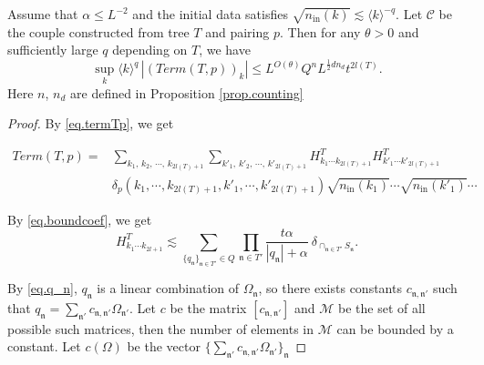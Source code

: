 \begin{lem}\label{lem.Tpvariance} Assume that $\alpha\le L^{-2}$ and the initial data satisfies $\sqrt{n_{\textrm{in}}(k)}\lesssim \langle k\rangle^{-q}$. Let $\mathcal{C}$ be the couple constructed from tree $T$ and pairing $p$. Then for any $\theta>0$ and sufficiently large $q$ depending on $T$, we have
\begin{equation}
    \sup_k\langle k\rangle^q\, |(Term(T,p))_k|\le L^{O(\theta)} Q^{n} L^{\frac{1}{2} dn_d} t^{2l(T)}.
\end{equation}
Here $n$, $n_d$ are defined in Proposition \ref{prop.counting}
\end{lem}
\begin{proof} By \eqref{eq.termTp}, we get

\begin{equation}
\begin{split}
    Term(T, p)=&\sum_{k_1,\, k_2,\, \cdots,\, k_{2l(T)+1}}\sum_{k'_1,\, k'_2,\, \cdots,\, k'_{2l(T)+1}} H^T_{k_1\cdots k_{2l(T)+1}} H^{T}_{k'_1\cdots k'_{2l(T)+1}}
    \\
    & \delta_{p}(k_1,\cdots, k_{2l(T)+1}, k'_1,\cdots, k'_{2l(T)+1})\sqrt{n_{\textrm{in}}(k_1)}\cdots\sqrt{n_{\textrm{in}}(k'_1)}\cdots
\end{split}
\end{equation}

By \eqref{eq.boundcoef}, we get
\begin{equation}
    H^T_{k_1\cdots k_{2l+1}}\lesssim \sum_{\{q_{\mathfrak{n}}\}_{\mathfrak{n}\in T'}\in Q}\prod_{\mathfrak{n}\in T'}\frac{t\alpha}{|q_{\mathfrak{n}}|+\alpha}\ \delta_{\cap_{\mathfrak{n}\in T'} S_{\mathfrak{n}}}.
\end{equation}

By \eqref{eq.q_n}, $q_{\mathfrak{n}}$ is a linear combination of $\Omega_{\mathfrak{n}}$, so there exists constants $c_{\mathfrak{n},\mathfrak{n}'}$ such that $q_{\mathfrak{n}}=\sum_{\mathfrak{n}'}c_{\mathfrak{n},\mathfrak{n}'}\Omega_{\mathfrak{n}'}$. Let $c$ be the matrix $[c_{\mathfrak{n},\mathfrak{n}'}]$ and $\mathscr{M}$ be the set of all possible such matrices, then the number of elements in $\mathscr{M}$ can be bounded by a constant. Let $c(\Omega)$ be the vector $\{\sum_{\mathfrak{n}'}c_{\mathfrak{n},\mathfrak{n}'}\Omega_{\mathfrak{n}'}\}_{\mathfrak{n}}$


\end{proof}
